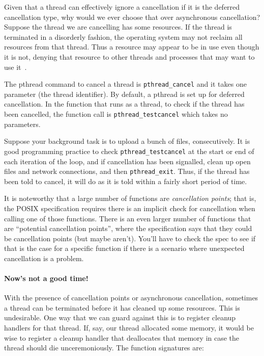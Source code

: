 Given that a thread can effectively ignore a cancellation if it is the deferred cancellation type, why would we ever choose that over asynchronous cancellation? Suppose the thread we are cancelling has some resources. If the thread is terminated in a disorderly fashion, the operating system may not reclaim all resources from that thread. Thus a resource may appear to be in use even though it is not, denying that resource to other threads and processes that may want to use it~\cite{osc}.

The pthread command to cancel a thread is \texttt{pthread\_cancel} and it takes one parameter (the thread identifier). By default, a pthread is set up for deferred cancellation. In the function that runs as a thread, to check if the thread has been cancelled, the function call is \texttt{pthread\_testcancel} which takes no parameters.

Suppose your background task is to upload a bunch of files, consecutively. It is good programming practice to check \texttt{pthread\_testcancel} at the start or end of each iteration of the loop, and if cancellation has been signalled, clean up open files and network connections, and then \texttt{pthread\_exit}. Thus, if the thread has been told to cancel, it will do as it is told within a fairly short period of time.

It is noteworthy that a large number of functions are \textit{cancellation points}; that is, the POSIX specification requires there is an implicit check for cancellation when calling one of those functions. There is an even larger number of functions that are ``potential cancellation points'', where the specification says that they could be cancellation points (but maybe aren't). You'll have to check the spec to see if that is the case for a specific function if there is a scenario where unexpected cancellation is a problem.

\paragraph{Now's not a good time!} With the presence of cancellation points or asynchronous cancellation, sometimes a thread can be terminated before it has cleaned up some resources. This is undesirable. One way that we can guard against this is to register cleanup handlers for that thread. If, say, our thread allocated some memory, it would be wise to register a cleanup handler that deallocates that memory in case the thread should die unceremoniously. The function signatures are:

